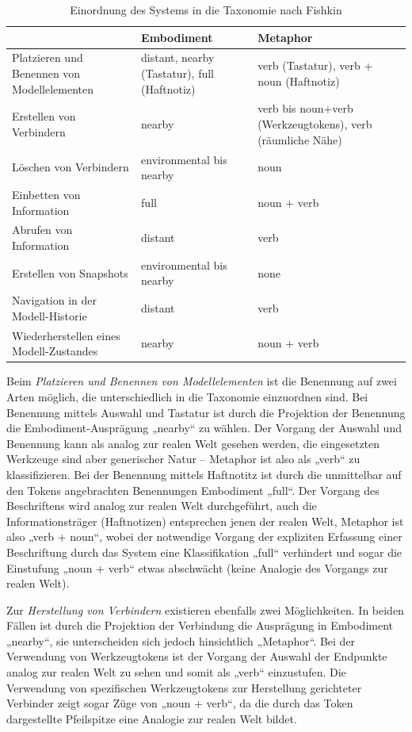 \begin{table}[htbp]
	\centering
	\caption{Einordnung des Systems in die Taxonomie nach Fishkin}
	\begin{tabular}{| p{6cm} || p{3cm} | p{3cm} |} 
		\hline
		 & Embodiment & Metaphor \\ \hline \hline
		Platzieren und Benennen von Modellelementen & distant, nearby (Tastatur), full (Haftnotiz) & verb (Tastatur), verb + noun (Haftnotiz) \\ \hline
		Erstellen von Verbindern & nearby & verb bis noun+verb (Werkzeugtokens), verb (räumliche Nähe)\\ \hline
		Löschen von Verbindern & environmental bis nearby & noun \\ \hline
		Einbetten von Information & full & noun + verb \\ \hline
		Abrufen von Information & distant & verb \\ \hline
		Erstellen von Snapshots & environmental bis nearby & none \\ \hline
		Navigation in der Modell-Historie & distant & verb \\ \hline
		Wiederherstellen eines Modell-Zustandes & nearby & noun + verb\\ \hline		
	\end{tabular}
	\label{tab:einordnungFishkin}
\end{table}

Beim \emph{Platzieren und Benennen von Modellelementen} ist die Benennung auf zwei Arten möglich, die unterschiedlich in die Taxonomie einzuordnen sind. Bei Benennung mittels Auswahl und Tastatur ist durch die Projektion der Benennung die Embodiment-Ausprägung „nearby“ zu wählen. Der Vorgang der Auswahl und Benennung kann als analog zur realen Welt gesehen werden, die eingesetzten Werkzeuge sind aber generischer Natur -- Metaphor ist also als „verb“ zu klassifizieren. Bei der Benennung mittels Haftnotitz ist durch die unmittelbar auf den Tokens angebrachten Benennungen Embodiment „full“. Der Vorgang des Beschriftens wird analog zur realen Welt durchgeführt, auch die Informationsträger (Haftnotizen) entsprechen jenen der realen Welt, Metaphor ist also „verb + noun“, wobei  der notwendige Vorgang der expliziten Erfassung einer Beschriftung durch das System eine Klassifikation „full“ verhindert und sogar die Einstufung „noun + verb“ etwas abschwächt (keine Analogie des Vorgangs zur realen Welt).

Zur \emph{Herstellung von Verbindern} existieren ebenfalls zwei Möglichkeiten. In beiden Fällen ist durch die Projektion der Verbindung die Ausprägung in Embodiment „nearby“, sie unterscheiden sich jedoch hinsichtlich „Metaphor“. Bei der Verwendung von Werkzeugtokens ist der Vorgang der Auswahl der Endpunkte analog zur realen Welt zu sehen und somit als „verb“ einzustufen. Die Verwendung von spezifischen Werkzeugtokens zur Herstellung gerichteter Verbinder zeigt sogar Züge von „noun + verb“, da die durch das Token dargestellte Pfeilspitze eine Analogie zur realen Welt bildet.

